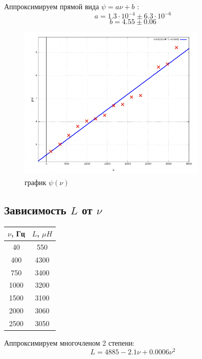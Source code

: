\documentclass[11pt]{article}
\begin{document}
Аппроксимируем прямой вида \( \psi = a\nu + b \) :
\[ a = 1.3\cdot 10^{-4} \pm 6.3\cdot 10^{-6} \]
\[ b = 4.55 \pm 0.06 \]

\begin{figure}[H]
    \centering
    \includegraphics[width=0.8\textwidth]{5.png}
    \caption{график \( \psi(\nu) \)}
\end{figure}

\subsection{Зависимость \(L\) от \(\nu\)}

\begin{table}[H]
    \centering
    \begin{tabular}{|c|c|}
    \hline
    \(\nu\), Гц & \(L\), \(\mu H\) \\\hline
    40  & 550 \\\hline
    400 & 4300\\\hline
    750 & 3400\\\hline
    1000& 3200\\\hline
    1500& 3100\\\hline
    2000& 3060\\\hline
    2500& 3050\\\hline
    \end{tabular}
\end{table}

Аппроксимируем многочленом 2 степени:
\[ L = 4885 - 2.1\nu + 0.0006\nu^2 \]
\end{document}
